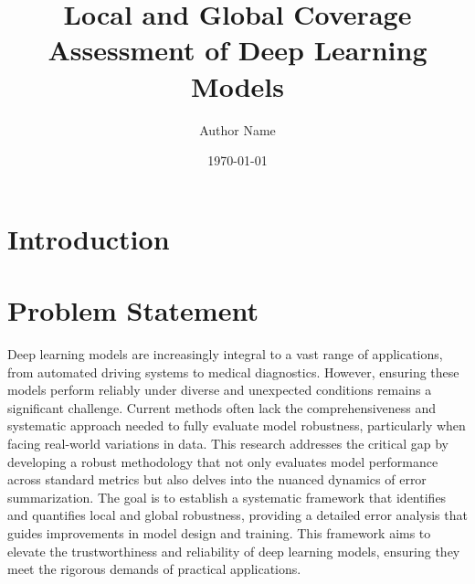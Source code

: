 \documentclass[10pt, conference, a4paper, final]{IEEEtran}
\title{Local and Global Coverage Assessment of Deep Learning Models}
\author{Author Name}
\date{\today}
\begin{document}
\maketitle

\begin{abstract}
\end{abstract}


\section{Introduction}

\section{Problem Statement}
Deep learning models are increasingly integral to a vast range of applications, from automated driving systems to medical diagnostics. However, ensuring these models perform reliably under diverse and unexpected conditions remains a significant challenge. Current methods often lack the comprehensiveness and systematic approach needed to fully evaluate model robustness, particularly when facing real-world variations in data. This research addresses the critical gap by developing a robust methodology that not only evaluates model performance across standard metrics but also delves into the nuanced dynamics of error summarization. The goal is to establish a systematic framework that identifies and quantifies local and global robustness, providing a detailed error analysis that guides improvements in model design and training. This framework aims to elevate the trustworthiness and reliability of deep learning models, ensuring they meet the rigorous demands of practical applications.
\end{document}
